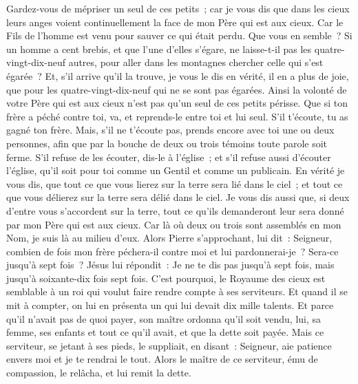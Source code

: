 \begin{multicols}{2}
Gardez-vous de mépriser un seul de ces petits~; car je vous dis que dans les cieux leurs anges voient continuellement la face de mon Père qui est aux cieux.
Car le Fils de l'homme est venu pour sauver ce qui était perdu.
Que vous en semble~? Si un homme a cent brebis, et que l'une d'elles s'égare, ne laisse-t-il pas les quatre-vingt-dix-neuf autres, pour aller dans les montagnes chercher celle qui s'est égarée~?
Et, s'il arrive qu'il la trouve, je vous le dis en vérité, il en a plus de joie, que pour les quatre-vingt-dix-neuf qui ne se sont pas égarées.
Ainsi la volonté de votre Père qui est aux cieux n'est pas qu'un seul de ces petits périsse.
Que si ton frère a péché contre toi, va, et reprends-le entre toi et lui seul. S'il t'écoute, tu as gagné ton frère.
Mais, s'il ne t'écoute pas, prends encore avec toi une ou deux personnes, afin que par la bouche de deux ou trois témoins toute parole soit ferme.
S'il refuse de les écouter, dis-le à l'église~; et s'il refuse aussi d'écouter l'église, qu'il soit pour toi comme un Gentil et comme un publicain.
En vérité je vous dis, que tout ce que vous lierez sur la terre sera lié dans le ciel~; et tout ce que vous délierez sur la terre sera délié dans le ciel.
Je vous dis aussi que, si deux d'entre vous s'accordent sur la terre, tout ce qu'ils demanderont leur sera donné par mon Père qui est aux cieux.
Car là où deux ou trois sont assemblés en mon Nom, je suis là au milieu d'eux.
Alors Pierre s'approchant, lui dit~: Seigneur, combien de fois mon frère péchera-il contre moi et lui pardonnerai-je~? Sera-ce jusqu'à sept fois~?
Jésus lui répondit~: Je ne te dis pas jusqu'à sept fois, mais jusqu'à soixante-dix fois sept fois.
C'est pourquoi, le Royaume des cieux est semblable à un roi qui voulut faire rendre compte à ses serviteurs.
Et quand il se mit à compter, on lui en présenta un qui lui devait dix mille talents.
Et parce qu'il n'avait pas de quoi payer, son maître ordonna qu'il soit vendu, lui, sa femme, ses enfants et tout ce qu'il avait, et que la dette soit payée.
Mais ce serviteur, se jetant à ses pieds, le suppliait, en disant~: Seigneur, aie patience envers moi et je te rendrai le tout.
Alors le maître de ce serviteur, ému de compassion, le relâcha, et lui remit la dette.

\end{multicols}
